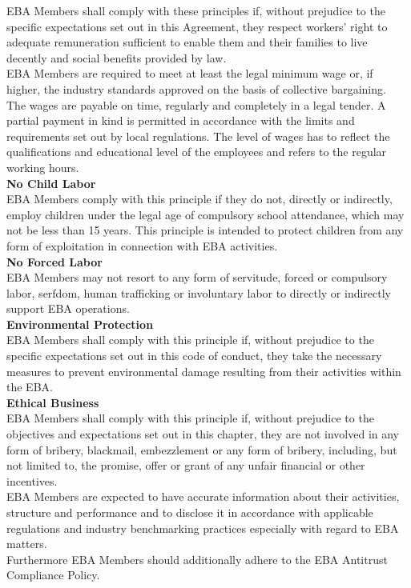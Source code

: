 \documentclass{article}
\begin{document}
EBA Members shall comply with these principles if, without prejudice to the specific expectations set out in this Agreement, they respect workers' right to adequate remuneration sufficient to enable them and their families to live decently and social benefits provided by law. \\
EBA Members are required to meet at least the legal minimum wage or, if higher, the industry standards approved on the basis of collective bargaining. \\
The wages are payable on time, regularly and completely in a legal tender. 
A partial payment in kind is permitted in accordance with the limits and requirements set out by local regulations. 
The level of wages has to reflect the qualifications and educational level of the employees and refers to the regular working hours. \\

\textbf{No Child Labor} \\

EBA Members comply with this principle if they do not, directly or indirectly, employ children under the legal age of compulsory school attendance, which may not be less than 15 years. 
This principle is intended to protect children from any form of exploitation in connection with EBA activities. \\

\textbf{No Forced Labor} \\

EBA Members may not resort to any form of servitude, forced or compulsory labor, serfdom, human trafficking or involuntary labor to directly or indirectly support EBA operations. \\

\textbf{Environmental Protection} \\

EBA Members shall comply with this principle if, without prejudice to the specific expectations set out in this code of conduct, they take the necessary measures to prevent environmental damage resulting from their activities within the EBA. \\

\textbf{Ethical Business} \\

EBA Members shall comply with this principle if, without prejudice to the objectives and expectations set out in this chapter, they are not involved in any form of bribery, blackmail, embezzlement or any form of bribery, including, but not limited to, the promise, offer or grant of any unfair financial or other incentives.\\
EBA Members are expected to have accurate information about their activities, structure and performance and to disclose it in accordance with applicable regulations and industry benchmarking practices especially with regard to EBA matters. \\
Furthermore EBA Members should additionally adhere to the EBA Antitrust Compliance Policy. \\
\end{document}
